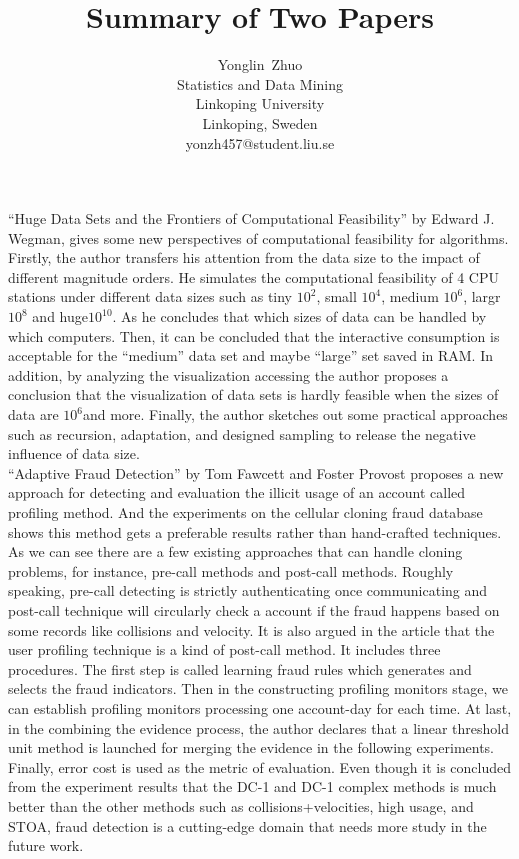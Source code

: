 \documentclass[11pt,onecolumn]{IEEEtran}
\begin{document}
\linespread{1.5}
\title{Summary of Two Papers}
\author{Yonglin~Zhuo\\
  Statistics and Data Mining\\
  Linkoping University\\
  Linkoping, Sweden\\
  yonzh457@student.liu.se}
\maketitle


\IEEEpeerreviewmaketitle

``Huge Data Sets and the Frontiers of Computational Feasibility'' by Edward J. Wegman\cite{hugedata}, gives some new perspectives of computational feasibility for algorithms. Firstly, the author transfers his attention from the data size to the impact of different magnitude orders. He simulates the computational feasibility of 4 CPU stations under different data sizes such as tiny $10^2$, small $10^4$, medium $10^6$, largr$10^8$ and huge$10^{10}$. As he concludes that which sizes of data can be handled by which computers. Then, it can be concluded that the interactive consumption is acceptable for the ``medium'' data set and maybe ``large'' set saved in RAM. In addition, by analyzing the visualization accessing the author proposes a conclusion that the visualization of data sets is hardly feasible when the sizes of data are $10^6$and more. Finally, the author sketches out some practical approaches such as recursion, adaptation, and designed sampling to release the negative inﬂuence of data size.\\

``Adaptive Fraud Detection'' by Tom Fawcett and Foster Provost\cite{Fraud} proposes a new approach for detecting and evaluation the illicit usage of an account called proﬁling method. And the experiments on the cellular cloning fraud database shows this method gets a preferable results rather than hand-crafted techniques. As we can see there are a few existing approaches that can handle cloning problems, for instance, pre-call methods and post-call methods\cite{Fraud}. Roughly speaking, pre-call detecting is strictly authenticating once communicating and post-call technique will circularly check a account if the fraud happens based on some records like collisions and velocity. It is also argued in the article that the user proﬁling technique\cite{Fraud} is a kind of post-call method. It includes three procedures. The ﬁrst step is called learning fraud rules\cite{Fraud} which generates and selects the fraud indicators. Then in the constructing proﬁling monitors stage, we can establish proﬁling monitors processing one account-day for each time. At last, in the combining the evidence process, the author declares that a linear threshold unit method is launched for merging the evidence in the following experiments. Finally, error cost is used as the metric of evaluation. Even though it is concluded from the experiment results that the DC-1 and DC-1 complex methods is much better than the other methods such as collisions+velocities, high usage, and STOA\cite{Fraud}, fraud detection is a cutting-edge domain that needs more study in the future work.
\ifCLASSOPTIONcaptionsoff
  \newpage
\fi


\renewcommand\refname{Reference}
\small


\end{document}
